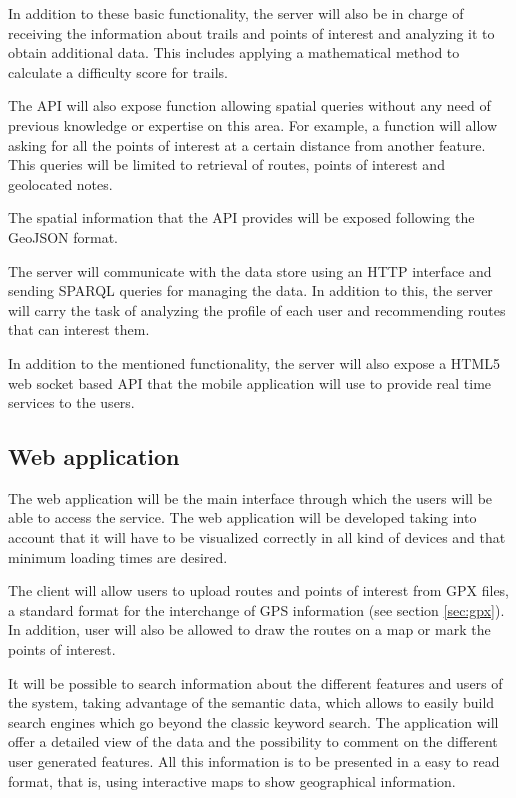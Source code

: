 In addition to these basic functionality, the server will also be in charge of receiving the information about trails and points of interest and analyzing it to obtain additional data. This includes applying a mathematical method to calculate a difficulty score for trails.

The API will also expose function allowing spatial queries without any need of previous knowledge or expertise on this area. For example, a function will allow asking for all the points of interest at a certain distance from another feature. This queries will be limited to retrieval of routes, points of interest and geolocated notes.

The spatial information that the API provides will be exposed following the GeoJSON format.

The server will communicate with the data store using an HTTP interface and sending SPARQL queries for managing the data. In addition to this, the server will carry the task of analyzing the profile of each user and recommending routes that can interest them.

In addition to the mentioned functionality, the server will also expose a HTML5 web socket based API that the mobile application will use to provide real time services to the users.

\subsection{Web application}

The web application will be the main interface through which the users will be able to access the service. The web application will be developed taking into account that it will have to be visualized correctly in all kind of devices and that minimum loading times are desired.

The client will allow users to upload routes and points of interest from GPX files, a standard format for the interchange of GPS information (see section \ref{sec:gpx}). In addition, user will also be allowed to draw the routes on a map or mark the points of interest.

It will be possible to search information about the different features and users of the system, taking advantage of the semantic data, which allows to easily build search engines which go beyond the classic keyword search. The application will offer a detailed view of the data and the possibility to comment on the different user generated features. All this information is to be presented in a easy to read format, that is, using interactive maps to show geographical information.


